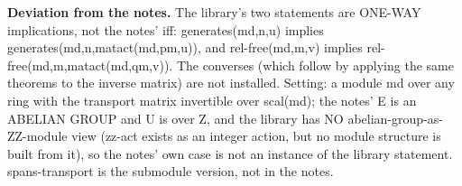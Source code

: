 %
\noindent\textbf{Deviation from the notes.} The library's two statements are ONE-WAY implications, not the notes' iff: generates(md,n,u) implies generates(md,n,matact(md,pm,u)), and rel-free(md,m,v) implies rel-free(md,m,matact(md,qm,v)).  The converses (which follow by applying the same theorems to the inverse matrix) are not installed.  Setting: a module md over any ring with the transport matrix invertible over scal(md); the notes' E is an ABELIAN GROUP and U is over Z, and the library has NO abelian-group-as-ZZ-module view (zz-act exists as an integer action, but no module structure is built from it), so the notes' own case is not an instance of the library statement.  spans-transport is the submodule version, not in the notes.
%
\renewcommand{\thethm}{3.41}
\begin{prop}\label{thm:free-length-le-generators}
%
%
\end{prop}
%
